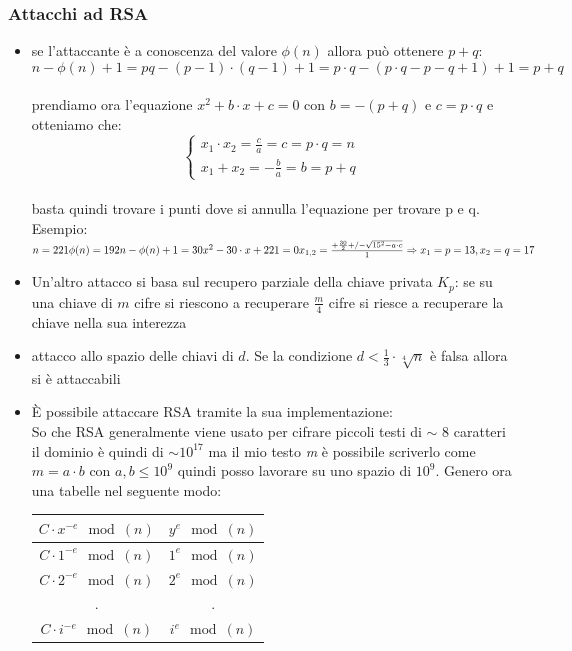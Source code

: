 \documentclass[10pt,a4paper]{article}
\begin{document}
\subsubsection{Attacchi ad RSA}
\begin{itemize}
\item se l'attaccante è a conoscenza del valore $\phi(n)$ allora può ottenere $p+q$:
$$n- \phi(n)+1 = pq-(p-1)\cdot(q-1)+1 = p\cdot q - (p\cdot q-p-q+1)+1 = p+q$$\\
prendiamo ora l'equazione $x^2+b\cdot x + c = 0$ con $b=-(p+q)$ e $c=p\cdot q$ e otteniamo che:\\
$$\begin{cases}
x_1\cdot x_2 = \frac{c}{a} = c = p\cdot q = n\\
x_1+x_2 = -\frac{b}{a} = b = p+q
\end{cases}$$\\
basta quindi trovare i punti dove si annulla l'equazione per trovare p e q.\\
Esempio:
$n=221 \phi(n)=192 \\ n-\phi(n)+1=30 \\ x^2-30\cdot x + 221 = 0 \\ x_{1,2}=\frac{+\frac{30}{2}+/- \sqrt{15^2-a \cdot c} }{1} \Rightarrow x_1=p=13,x_2=q=17$
\item Un'altro attacco si basa sul recupero parziale della chiave privata $K_p$: se su una chiave di $m$ cifre si riescono a recuperare $\frac{m}{4}$ cifre si riesce a recuperare la chiave nella sua interezza
\item attacco allo spazio delle chiavi di $d$. Se la condizione $d<\frac{1}{3}\cdot\sqrt[4]{n}$ è falsa allora si è attaccabili
\item È possibile attaccare RSA tramite la sua implementazione:\\
So che RSA generalmente viene usato per cifrare piccoli testi di $\sim$ 8 caratteri il dominio è quindi di $\sim 10^{17}$ ma il mio testo \textit{m} è possibile scriverlo come $m=a\cdot b$ con $a,b\le 10^9$ quindi posso lavorare su uno spazio di $10^9$. Genero ora una tabelle nel seguente modo:
\begin{center}
\begin{tabular}{c|c}
$C\cdot x^{-e} \mod(n)$& 	$y^e \mod(n)$ \\
\hline
$C\cdot 1^{-e} \mod(n)$& 	$1^e \mod(n)$ \\
$C\cdot 2^{-e} \mod(n)$& 	$2^e \mod(n)$ \\
.&.\\
$C\cdot i^{-e} \mod(n)$& 	$i^e \mod(n)$  \\

\end{tabular}
\end{center}
\end{itemize}
\end{document}
